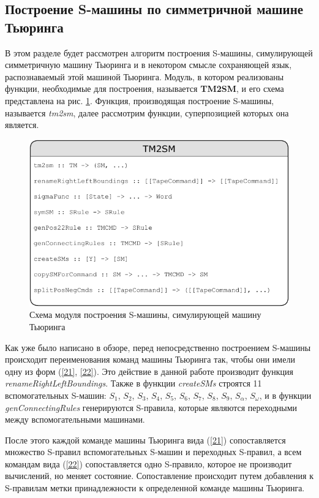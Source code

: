 \documentclass[14pt]{matmex-diploma-custom}
\begin{document}
\subsection{Построение S-машины по симметричной машине Тьюринга}
В этом разделе будет рассмотрен алгоритм построения S-машины, симулирующей симметричную машину Тьюринга и в некотором смысле сохраняющей язык, распознаваемый этой машиной Тьюринга. Модуль, в котором реализованы функции, необходимые для построения, называется \textbf{TM2SM}, и его схема представлена на рис. \ref{fig:TM2SM}. Функция, производящая построение S-машины, называется \textit{tm2sm}, далее рассмотрим функции, суперпозицией которых она является.

\begin{figure}[H]
\centering
  \includegraphics[width=\linewidth]{pics/TM2SM.pdf}
  \caption{Схема модуля построения S-машины, симулирующей машину Тьюринга}
  \label{fig:TM2SM}
\end{figure}

Как уже было написано в обзоре, перед непосредственно построением S-машины происходит переименования команд машины Тьюринга так, чтобы они имели одну из форм (\ref{21}, \ref{22}). Это действие в данной работе производит функция \textit{renameRightLeftBoundings}. Также в функции \textit{createSMs} строятся 11 вспомогательных S-машин: $S_1$, $S_2$, $S_3$, $S_4$, $S_5$, $S_6$, $S_7$, $S_8$, $S_9$, $S_{\alpha}$, $S_{\omega}$, и в функции \textit{genConnectingRules} генерируются S-правила, которые являются переходными между вспомогательными машинами. 

После этого каждой команде машины Тьюринга вида (\ref{21}) сопоставляется множество S-правил вспомогательных S-машин и переходных S-правил, а всем командам вида (\ref{22}) сопоставляется одно S-правило, которое не производит вычислений, но меняет состояние. Сопоставление происходит путем добавления к S-правилам метки принадлежности к определенной команде машины Тьюринга. 
\end{document}
